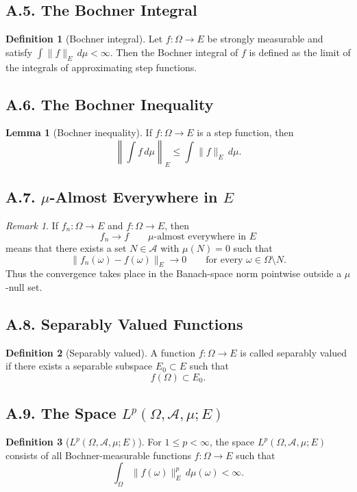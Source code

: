\documentclass[11pt]{article}
\theoremstyle{definition}
\newtheorem{definition}{Definition}
\newtheorem{lemma}{Lemma}
\theoremstyle{remark}
\newtheorem{remark}{Remark}
\begin{document}
\subsection*{A.5. The Bochner Integral}
\begin{definition}[Bochner integral]
Let \(f:\Omega\to E\) be strongly measurable and satisfy \(\int \|f\|_E\,d\mu<\infty\).
Then the Bochner integral of \(f\) is defined as the limit of the integrals of approximating step functions.
\end{definition}

\subsection*{A.6. The Bochner Inequality}
\begin{lemma}[Bochner inequality]
If \(f:\Omega\to E\) is a step function, then
\[
\left\|\int f\,d\mu\right\|_E\le \int \|f\|_E\,d\mu.
\]
\end{lemma}

\subsection*{A.7. \(\mu\)-Almost Everywhere in \(E\)}
\begin{remark}
If \(f_n:\Omega\to E\) and \(f:\Omega\to E\), then
\[
f_n\to f
\qquad \mu\text{-almost everywhere in } E
\]
means that there exists a set \(N\in\mathcal A\) with \(\mu(N)=0\) such that
\[
\|f_n(\omega)-f(\omega)\|_E\to 0
\qquad \text{for every } \omega\in \Omega\setminus N.
\]
Thus the convergence takes place in the Banach-space norm pointwise outside a \(\mu\)-null set.
\end{remark}

\subsection*{A.8. Separably Valued Functions}
\begin{definition}[Separably valued]
A function \(f:\Omega\to E\) is called separably valued if there exists a separable subspace \(E_0\subset E\) such that
\[
f(\Omega)\subset E_0.
\]
\end{definition}

\subsection*{A.9. The Space \(L^p(\Omega,\mathcal A,\mu;E)\)}
\begin{definition}[\(L^p(\Omega,\mathcal A,\mu;E)\)]
For \(1\le p<\infty\), the space \(L^p(\Omega,\mathcal A,\mu;E)\) consists of all Bochner-measurable functions \(f:\Omega\to E\) such that
\[
\int_\Omega \|f(\omega)\|_E^p\,d\mu(\omega)<\infty.
\]
\end{definition}
\end{document}
